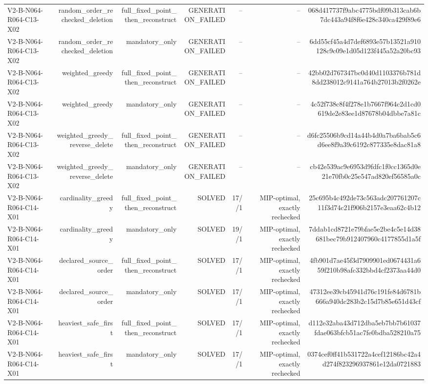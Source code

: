 {\begin{longtable}{lrrrrrr}
V2-B-N064-R064-C13-X02 & random\_order\_rechecked\_deletion & full\_fixed\_point\_then\_reconstruct & GENERATION\_FAILED & -- & -- & 068d417737f9abc4775bdf09b313cab6b7dc443a94f8f6e428c340ca429f89e6 \\
V2-B-N064-R064-C13-X02 & random\_order\_rechecked\_deletion & mandatory\_only & GENERATION\_FAILED & -- & -- & 6dd55cf45a4d7def6893e57b13521a910128c9c09e1d05d123f445a52a20bc93 \\
V2-B-N064-R064-C13-X02 & weighted\_greedy & full\_fixed\_point\_then\_reconstruct & GENERATION\_FAILED & -- & -- & 42bb02d767347bc0d40d1103376b781d8dd238012c9141a764b27013b2f0262e \\
V2-B-N064-R064-C13-X02 & weighted\_greedy & mandatory\_only & GENERATION\_FAILED & -- & -- & 4c52f738c8f4f278e1b7667f964c2d1cd0619de2e83ee1d87678b04dbbe7a81c \\
V2-B-N064-R064-C13-X02 & weighted\_greedy\_reverse\_delete & full\_fixed\_point\_then\_reconstruct & GENERATION\_FAILED & -- & -- & d6fc25506b9cd14a44b4d0a7ba6bab5c6d6ee8f9a39c6192c877335e8dac81a8 \\
V2-B-N064-R064-C13-X02 & weighted\_greedy\_reverse\_delete & mandatory\_only & GENERATION\_FAILED & -- & -- & cb42e539ac9e6953d9fdfc1f0cc1365d0e21e70fb0c25e547ad820ef56585a0c \\
V2-B-N064-R064-C14-X01 & cardinality\_greedy & full\_fixed\_point\_then\_reconstruct & SOLVED & 17//1 & MIP-optimal, exactly rechecked & 25c695b4c492de73c563adc207761207c11f3d74c21f906b2157e3eaa62c4b12 \\
V2-B-N064-R064-C14-X01 & cardinality\_greedy & mandatory\_only & SOLVED & 19//1 & MIP-optimal, exactly rechecked & 7ddab1cd8721e79bfae5e2be4c5e14d38681bec79b912407960c4177855d1a5f \\
V2-B-N064-R064-C14-X01 & declared\_source\_order & full\_fixed\_point\_then\_reconstruct & SOLVED & 17//1 & MIP-optimal, exactly rechecked & 4fb901d7ae45f3d7909901ed0674431a659f210b98afc332bbd4cf2373aa44d0 \\
V2-B-N064-R064-C14-X01 & declared\_source\_order & mandatory\_only & SOLVED & 17//1 & MIP-optimal, exactly rechecked & 47312ee39cb45941d76c191fe84d6781b666a940dc283b2c15d7b85e651d43cf \\
V2-B-N064-R064-C14-X01 & heaviest\_safe\_first & full\_fixed\_point\_then\_reconstruct & SOLVED & 17//1 & MIP-optimal, exactly rechecked & d112e32aba43d712dba5eb7bb7b61037fdae063bfcb51ac7fe0bdba528210a75 \\
V2-B-N064-R064-C14-X01 & heaviest\_safe\_first & mandatory\_only & SOLVED & 17//1 & MIP-optimal, exactly rechecked & 0374cef0ff41b531722a4cef12186bc42a4d274f823296937861e12da0721883 \\

\end{longtable}}
